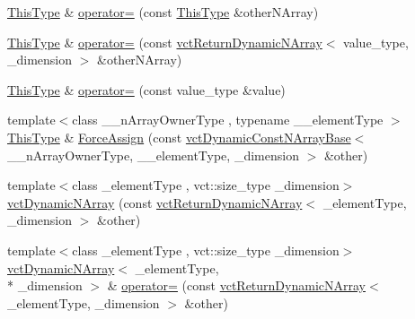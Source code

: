 \begin{DoxyCompactItemize}
\item 
\hyperlink{classvct_dynamic_const_n_array_base_a5123caffcf1455a1b99003877eade897}{This\-Type} \& \hyperlink{classvct_dynamic_n_array_a8ccc195be994b978578b5aa25ff1698f}{operator=} (const \hyperlink{classvct_dynamic_const_n_array_base_a5123caffcf1455a1b99003877eade897}{This\-Type} \&other\-N\-Array)
\item 
\hyperlink{classvct_dynamic_const_n_array_base_a5123caffcf1455a1b99003877eade897}{This\-Type} \& \hyperlink{classvct_dynamic_n_array_a46790594f24b17dd1f5c808210cf36c8}{operator=} (const \hyperlink{classvct_return_dynamic_n_array}{vct\-Return\-Dynamic\-N\-Array}$<$ value\-\_\-type, \-\_\-dimension $>$ \&other\-N\-Array)
\item 
\hyperlink{classvct_dynamic_const_n_array_base_a5123caffcf1455a1b99003877eade897}{This\-Type} \& \hyperlink{classvct_dynamic_n_array_a4ce29de727ea0de98fdc92f68323fa7a}{operator=} (const value\-\_\-type \&value)
\item 
{\footnotesize template$<$class \-\_\-\-\_\-n\-Array\-Owner\-Type , typename \-\_\-\-\_\-element\-Type $>$ }\\\hyperlink{classvct_dynamic_const_n_array_base_a5123caffcf1455a1b99003877eade897}{This\-Type} \& \hyperlink{classvct_dynamic_n_array_a47f9ca5721cafaebe1562a98f946e276}{Force\-Assign} (const \hyperlink{classvct_dynamic_const_n_array_base}{vct\-Dynamic\-Const\-N\-Array\-Base}$<$ \-\_\-\-\_\-n\-Array\-Owner\-Type, \-\_\-\-\_\-element\-Type, \-\_\-dimension $>$ \&other)
\item 
{\footnotesize template$<$class \-\_\-element\-Type , vct\-::size\-\_\-type \-\_\-dimension$>$ }\\\hyperlink{classvct_dynamic_n_array_ace2a0ad0e87d96180509314c0b8afe13}{vct\-Dynamic\-N\-Array} (const \hyperlink{classvct_return_dynamic_n_array}{vct\-Return\-Dynamic\-N\-Array}$<$ \-\_\-element\-Type, \-\_\-dimension $>$ \&other)
\item 
{\footnotesize template$<$class \-\_\-element\-Type , vct\-::size\-\_\-type \-\_\-dimension$>$ }\\\hyperlink{classvct_dynamic_n_array}{vct\-Dynamic\-N\-Array}$<$ \-\_\-element\-Type, \\*
\-\_\-dimension $>$ \& \hyperlink{classvct_dynamic_n_array_a92e670ef0bfe55c12f2be1b0e857da07}{operator=} (const \hyperlink{classvct_return_dynamic_n_array}{vct\-Return\-Dynamic\-N\-Array}$<$ \-\_\-element\-Type, \-\_\-dimension $>$ \&other)
\end{DoxyCompactItemize}
{\bf }\par
